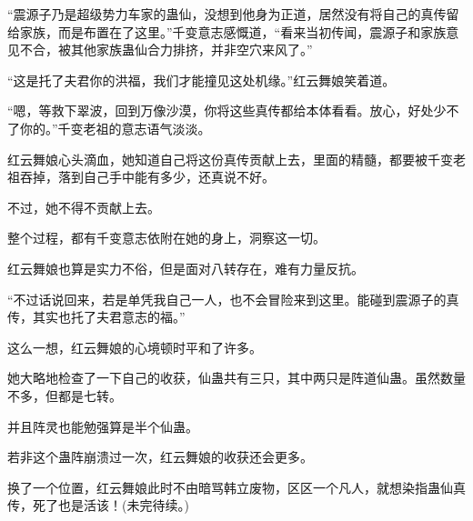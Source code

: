 \begin{this_body}
“震源子乃是超级势力车家的蛊仙，没想到他身为正道，居然没有将自己的真传留给家族，而是布置在了这里。”千变意志感慨道，“看来当初传闻，震源子和家族意见不合，被其他家族蛊仙合力排挤，并非空穴来风了。”

“这是托了夫君你的洪福，我们才能撞见这处机缘。”红云舞娘笑着道。

“嗯，等救下翠波，回到万像沙漠，你将这些真传都给本体看看。放心，好处少不了你的。”千变老祖的意志语气淡淡。

红云舞娘心头滴血，她知道自己将这份真传贡献上去，里面的精髓，都要被千变老祖吞掉，落到自己手中能有多少，还真说不好。

不过，她不得不贡献上去。

整个过程，都有千变意志依附在她的身上，洞察这一切。

红云舞娘也算是实力不俗，但是面对八转存在，难有力量反抗。

“不过话说回来，若是单凭我自己一人，也不会冒险来到这里。能碰到震源子的真传，其实也托了夫君意志的福。”

这么一想，红云舞娘的心境顿时平和了许多。

她大略地检查了一下自己的收获，仙蛊共有三只，其中两只是阵道仙蛊。虽然数量不多，但都是七转。

并且阵灵也能勉强算是半个仙蛊。

若非这个蛊阵崩溃过一次，红云舞娘的收获还会更多。

换了一个位置，红云舞娘此时不由暗骂韩立废物，区区一个凡人，就想染指蛊仙真传，死了也是活该！(未完待续。)

\end{this_body}

